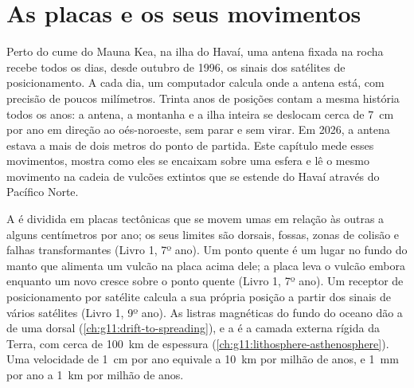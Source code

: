 \chapter{As placas e os seus movimentos}\label{ch:g11:plate-motions}

Perto do cume do Mauna Kea, na ilha do Havaí, uma antena fixada na rocha
recebe todos os dias, desde outubro de 1996, os sinais dos satélites de
posicionamento. A cada dia, um computador calcula onde a antena está, com
precisão de poucos milímetros. Trinta anos de posições contam a mesma
história todos os anos: a antena, a montanha e a ilha inteira se deslocam
cerca de \qty{7}{cm} por ano em direção ao oés-noroeste, sem parar e sem
virar. Em 2026, a antena estava a mais de dois metros do ponto de partida.
Este capítulo mede esses movimentos, mostra como eles se encaixam sobre uma
esfera e lê o mesmo movimento na cadeia de vulcões extintos que se estende
do Havaí através do Pacífico Norte.

\begin{recall}
A  é dividida em placas tectônicas que se movem umas em relação às
outras a alguns centímetros por ano; os seus limites são dorsais, fossas,
zonas de colisão e falhas transformantes (Livro 1, 7º ano). Um ponto quente
é um lugar no fundo do manto que alimenta um vulcão na placa acima dele; a
placa leva o vulcão embora enquanto um novo cresce sobre o ponto quente
(Livro 1, 7º ano). Um receptor de posicionamento por satélite calcula a sua
própria posição a partir dos sinais de vários satélites (Livro 1, 9º ano).
As listras magnéticas do fundo do oceano dão a  de uma
dorsal (\cref{ch:g11:drift-to-spreading}), e a  é a camada externa
rígida da Terra, com cerca de \qty{100}{km} de espessura
(\cref{ch:g11:lithosphere-asthenosphere}). Uma velocidade de \qty{1}{cm} por
ano equivale a \qty{10}{km} por milhão de anos, e \qty{1}{mm} por ano a
\qty{1}{km} por milhão de anos.
\end{recall}

